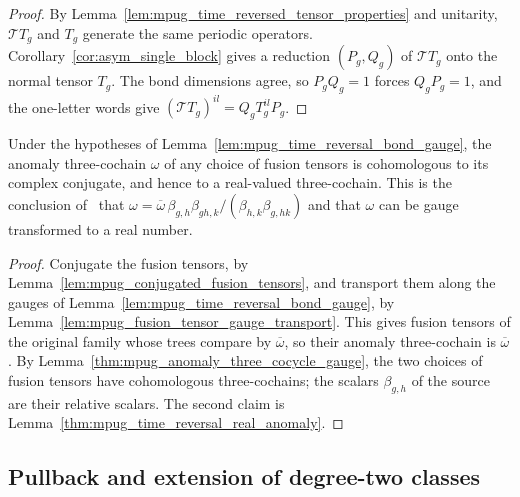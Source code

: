 \begin{proof}
    \leanok
    By Lemma~\ref{lem:mpug_time_reversed_tensor_properties} and
    unitarity, $\mathcal TT_g$ and $T_g$ generate the same periodic
    operators. Corollary~\ref{cor:asym_single_block} gives a reduction
    $(P_g,Q_g)$ of $\mathcal TT_g$ onto the normal tensor $T_g$. The bond
    dimensions agree, so $P_gQ_g=1$ forces $Q_gP_g=1$, and the one-letter
    words give $(\mathcal TT_g)^{il}=Q_gT_g^{il}P_g$.
\end{proof}

\begin{lemma}
    \label{lem:mpug_time_reversal_tensor_real_anomaly}
    \leanok
    Under the hypotheses of Lemma~\ref{lem:mpug_time_reversal_bond_gauge},
    the anomaly three-cochain $\omega$ of any choice of fusion tensors is
    cohomologous to its complex conjugate, and hence to a real-valued
    three-cochain. This is the conclusion
    of~\cite[Section~4.3]{GarreRubio2023MPOSym} that
    $\omega=\overline\omega\,\beta_{g,h}\beta_{gh,k}/(\beta_{h,k}\beta_{g,hk})$
    and that $\omega$ can be gauge transformed to a real number.
\end{lemma}

\begin{proof}
    \leanok
    Conjugate the fusion tensors, by
    Lemma~\ref{lem:mpug_conjugated_fusion_tensors}, and transport them
    along the gauges of Lemma~\ref{lem:mpug_time_reversal_bond_gauge}, by
    Lemma~\ref{lem:mpug_fusion_tensor_gauge_transport}. This gives fusion
    tensors of the original family whose trees compare by
    $\overline{\omega}$, so their anomaly three-cochain is $\overline\omega$.
    By Lemma~\ref{thm:mpug_anomaly_three_cocycle_gauge}, the two choices of
    fusion tensors have cohomologous three-cochains; the scalars $\beta_{g,h}$
    of the source are their relative scalars. The second claim is
    Lemma~\ref{thm:mpug_time_reversal_real_anomaly}.
\end{proof}

\subsection{Pullback and extension of degree-two classes}

